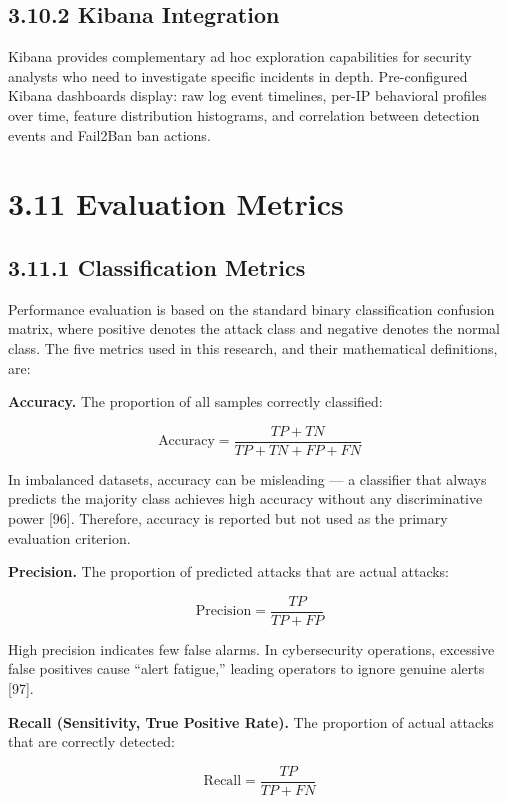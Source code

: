 \documentclass[
  a4paper]{report}
\begin{document}
\subsection{3.10.2 Kibana Integration}\label{kibana-integration}

Kibana provides complementary ad hoc exploration capabilities for
security analysts who need to investigate specific incidents in depth.
Pre-configured Kibana dashboards display: raw log event timelines,
per-IP behavioral profiles over time, feature distribution histograms,
and correlation between detection events and Fail2Ban ban actions.

\section{3.11 Evaluation Metrics}\label{evaluation-metrics}

\subsection{3.11.1 Classification Metrics}\label{classification-metrics}

Performance evaluation is based on the standard binary classification
confusion matrix, where positive denotes the attack class and negative
denotes the normal class. The five metrics used in this research, and
their mathematical definitions, are:

\textbf{Accuracy.} The proportion of all samples correctly classified:

\[\text{Accuracy} = \frac{TP + TN}{TP + TN + FP + FN}\]

In imbalanced datasets, accuracy can be misleading --- a classifier that
always predicts the majority class achieves high accuracy without any
discriminative power {[}96{]}. Therefore, accuracy is reported but not
used as the primary evaluation criterion.

\textbf{Precision.} The proportion of predicted attacks that are actual
attacks:

\[\text{Precision} = \frac{TP}{TP + FP}\]

High precision indicates few false alarms. In cybersecurity operations,
excessive false positives cause ``alert fatigue,'' leading operators to
ignore genuine alerts {[}97{]}.

\textbf{Recall (Sensitivity, True Positive Rate).} The proportion of
actual attacks that are correctly detected:

\[\text{Recall} = \frac{TP}{TP + FN}\]
\end{document}

